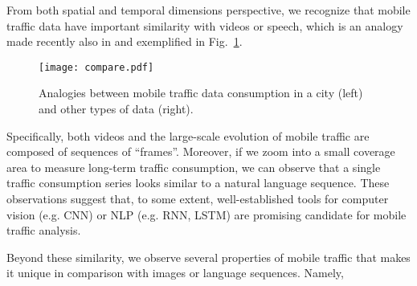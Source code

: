 \documentclass[journal,comsoc,letter]{IEEEtran}
\begin{document}
From both spatial and temporal dimensions perspective, we recognize that mobile traffic data have important similarity with videos or speech, which is an analogy made recently also in \cite{chaoyun2017zipnet} and exemplified in Fig.~\ref{fig:compare}.
\begin{figure}[htb]
\begin{center}
\texttt{[image: compare.pdf]}
\end{center}
\caption{\label{fig:compare} Analogies between mobile traffic data consumption in a city (left) and other types of data (right). }
\end{figure}
Specifically, both videos and the large-scale evolution of mobile traffic are composed of sequences of ``frames''. Moreover, if we zoom into a small coverage area to measure long-term traffic consumption, we can observe that a single traffic consumption series looks similar to a natural language sequence. These observations suggest that, to some extent, well-established tools for computer vision (e.g. CNN) or NLP (e.g. RNN, LSTM) are promising candidate for mobile traffic analysis.

Beyond these similarity, we observe several properties of mobile traffic that makes it unique in comparison with images or language sequences. Namely,
\end{document}
